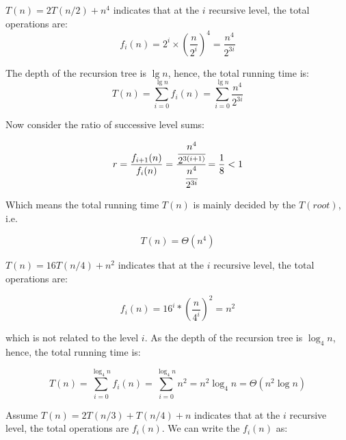 \begin{homeworkProblem} %

\begin{homeworkSubProblem}[$T(n)=2T(n/2)+n^4$]
$T(n)=2T(n/2)+n^4$ indicates that at the $i$ recursive level, the total
operations are:
\[f_i(n) = 2^i\times\left(\frac{n}{2^i}\right)^4=\frac{n^4}{2^{3i}}\]

The depth of the recursion tree is $\lg n$, hence, the total running time is:
\[T(n) =\sum_{i=0}^{\lg n}f_i(n) = \sum_{i=0}^{\lg n}\frac{n^4}{2^{3i}}\]

Now consider the ratio of successive level sums:

\begin{equation*}
r = \frac{f_{i+1}(n)}{f_i(n)}
  = \cfrac{\cfrac{n^4}{2^{3(i+1)}}}{\cfrac{n^4}{2^{3i}}}
  = \frac{1}{8}
  < 1
\end{equation*}

Which means the total running time $T(n)$ is mainly decided by the $T(root)$, i.e.

\begin{equation}
T(n) = \Theta(n^4)
\end{equation}

\end{homeworkSubProblem}

\begin{homeworkSubProblem}[$T(n)=16T(n/4)+n^2$]

$T(n)=16T(n/4)+n^2$ indicates that at the $i$ recursive level, the total
operations are:

\begin{equation*}
f_i(n) = 16^i*\left(\frac{n}{4^i}\right)^2=n^2
\end{equation*}

which is not related to the level $i$. As the depth of the recursion tree is $\log_4 n$, hence, the total running time is:

\begin{equation} \label{eq:6.2.1}
T(n)
=\sum_{i=0}^{\log_4 n}f_i(n)
= \sum_{i=0}^{\log_4 n}n^2
= n^2 \log_4 n
= \Theta(n^2\log n)
\end{equation}

\end{homeworkSubProblem}

\begin{homeworkSubProblem}[$T(n)=2T(n/3)+T(n/4)+n$]

Assume $T(n)=2T(n/3)+T(n/4)+n$ indicates that at the $i$ recursive level,
the total operations are $f_i(n)$. We can write the $f_i(n)$ as:


\end{homeworkSubProblem}
\end{homeworkProblem}
